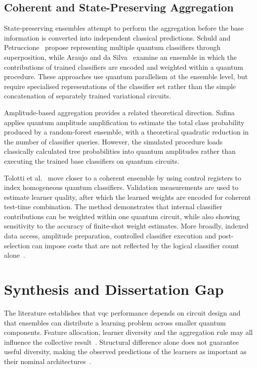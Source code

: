 \documentclass[]{UCD_CS_MSc_AAI_Report}
\begin{document}
\subsection{Coherent and State-Preserving Aggregation}
State-preserving ensembles attempt to perform the aggregation before the base information is converted into independent classical predictions. Schuld and Petruccione~\cite{schuld_quantum_2018} propose representing multiple quantum classifiers through superposition, while Araujo and da Silva~\cite{araujo_quantum_2020} examine an ensemble in which the contributions of trained classifiers are encoded and weighted within a quantum procedure. These approaches use quantum parallelism at the ensemble level, but require specialised representations of the classifier set rather than the simple concatenation of separately trained variational circuits.

Amplitude-based aggregation provides a related theoretical direction. Safina~\cite{safina_quantum_2023} applies quantum amplitude amplification to estimate the total class probability produced by a random-forest ensemble, with a theoretical quadratic reduction in the number of classifier queries. However, the simulated procedure loads classically calculated tree probabilities into quantum amplitudes rather than executing the trained base classifiers on quantum circuits.

Tolotti et al.~\cite{tolotti_weighted_2025} move closer to a coherent ensemble by using control registers to index homogeneous quantum classifiers. Validation measurements are used to estimate learner quality, after which the learned weights are encoded for coherent test-time combination. The method demonstrates that internal classifier contributions can be weighted within one quantum circuit, while also showing sensitivity to the accuracy of finite-shot weight estimates. More broadly, indexed data access, amplitude preparation, controlled classifier execution and post-selection can impose costs that are not reflected by the logical classifier count alone~\cite{schuld_quantum_2018,tolotti_weighted_2025}.

\section{Synthesis and Dissertation Gap}
\label{sec:rw-gap}

The literature establishes that \ac{vqc} performance depends on circuit design and that ensembles can distribute a learning problem across smaller quantum components. Feature allocation, learner diversity and the aggregation rule may all influence the collective result~\cite{incudini_resource_2023,mcfarthing_classical_2024,park_addressing_2025}. Structural difference alone does not guarantee useful diversity, making the observed predictions of the learners as important as their nominal architectures~\cite{pinto_composing_2026,radojicic_reducing_2026}.
\end{document}
